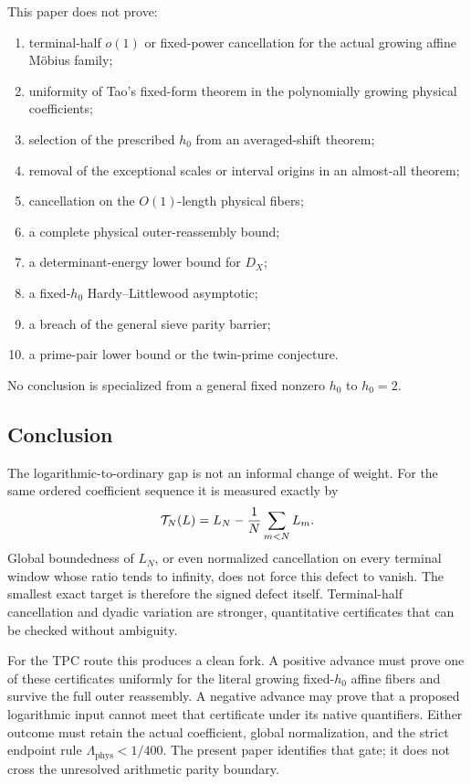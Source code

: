 This paper does not prove:
\begin{enumerate}[label=\textup{(\alph*)},leftmargin=2.5em]
 \item terminal-half \(o(1)\) or fixed-power cancellation for the
 actual growing affine M\"obius family;
 \item uniformity of Tao's fixed-form theorem in the polynomially
 growing physical coefficients;
 \item selection of the prescribed \(h_0\) from an averaged-shift
 theorem;
 \item removal of the exceptional scales or interval origins in an
 almost-all theorem;
 \item cancellation on the \(O(1)\)-length physical fibers;
 \item a complete physical outer-reassembly bound;
 \item a determinant-energy lower bound for \(D_X\);
 \item a fixed-\(h_0\) Hardy--Littlewood asymptotic;
 \item a breach of the general sieve parity barrier;
 \item a prime-pair lower bound or the twin-prime conjecture.
\end{enumerate}
No conclusion is specialized from a general fixed nonzero \(h_0\)
to \(h_0=2\).

\subsection{Conclusion}

The logarithmic-to-ordinary gap is not an informal change of weight.
For the same ordered coefficient sequence it is measured exactly by
\[
 \mathcal T_N(L)=
 L_N-\frac1N\sum_{m<N}L_m.
\]
Global boundedness of \(L_N\), or even normalized cancellation on
every terminal window whose ratio tends to infinity, does not force
this defect to vanish.  The smallest exact target is therefore the
signed defect itself.  Terminal-half cancellation and dyadic
variation are stronger, quantitative certificates that can be
checked without ambiguity.

For the TPC route this produces a clean fork.  A positive advance
must prove one of these certificates uniformly for the literal
growing fixed-\(h_0\) affine fibers and survive the full outer
reassembly.  A negative advance may prove that a proposed
logarithmic input cannot meet that certificate under its native
quantifiers.  Either outcome must retain the actual coefficient,
global normalization, and the strict endpoint rule
\(\Lambda_{\mathrm{phys}}<1/400\).  The present paper identifies that
gate; it does not cross the unresolved arithmetic parity boundary.

